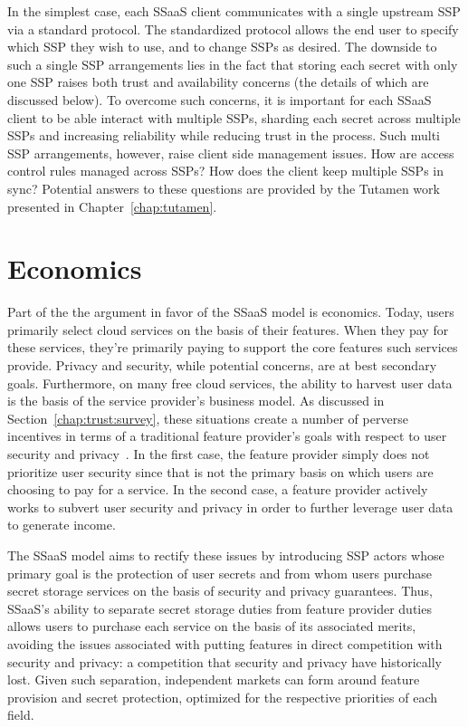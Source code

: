 In the simplest case, each SSaaS client communicates with a single
upstream SSP via a standard protocol. The standardized protocol allows
the end user to specify which SSP they wish to use, and to change SSPs
as desired. The downside to such a single SSP arrangements lies in the
fact that storing each secret with only one SSP raises both trust and
availability concerns (the details of which are discussed below). To
overcome such concerns, it is important for each SSaaS client to be
able interact with multiple SSPs, sharding each secret across multiple
SSPs and increasing reliability while reducing trust in the
process. Such multi SSP arrangements, however, raise client side
management issues. How are access control rules managed across SSPs?
How does the client keep multiple SSPs in sync? Potential answers to
these questions are provided by the Tutamen work presented in
Chapter~\ref{chap:tutamen}.

\section{Economics}
\label{chap:ssaas:economics}

Part of the the argument in favor of the SSaaS model is
economics. Today, users primarily select cloud services on the basis
of their features. When they pay for these services, they're primarily
paying to support the core features such services provide. Privacy and
security, while potential concerns, are at best secondary
goals. Furthermore, on many free cloud services, the ability to
harvest user data is the basis of the service provider's business
model. As discussed in Section~\ref{chap:trust:survey}, these
situations create a number of perverse incentives in terms of a
traditional feature provider's goals with respect to user security and
privacy~\cite{anderson2001}. In the first case, the feature provider
simply does not prioritize user security since that is not the primary
basis on which users are choosing to pay for a service. In the second
case, a feature provider actively works to subvert user security and
privacy in order to further leverage user data to generate income.

The SSaaS model aims to rectify these issues by introducing SSP actors
whose primary goal is the protection of user secrets and from whom
users purchase secret storage services on the basis of security and
privacy guarantees. Thus, SSaaS's ability to separate secret storage
duties from feature provider duties allows users to purchase each
service on the basis of its associated merits, avoiding the issues
associated with putting features in direct competition with security
and privacy: a competition that security and privacy have historically
lost. Given such separation, independent markets can form around
feature provision and secret protection, optimized for the respective
priorities of each field.

